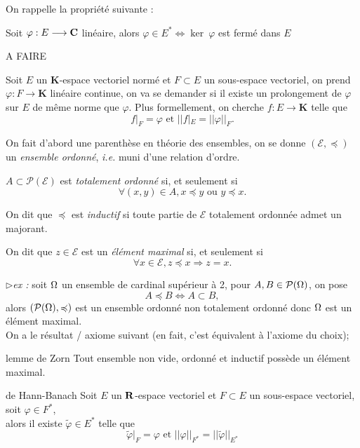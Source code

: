 \documentclass[a4paper,11pt, twoside]{article}
\begin{document}
On rappelle la propriété suivante : 


\begin{prop}
  Soit $\varphi:E\longrightarrow \mathbf C$ linéaire,
  alors $\varphi\in E^*\Leftrightarrow\ker\ \varphi$ est fermé dans $E$
\end{prop}


\begin{Proof}
  A FAIRE
\end{Proof}


Soit $E$ un $\mathbf K$-espace vectoriel normé et $F\subset E$ un sous-espace vectoriel, on prend $\varphi:F\longrightarrow \mathbf K$ linéaire continue, on va se demander si il existe un prolongement de $\varphi$ sur $E$ de même norme que $\varphi$. Plus formellement, on cherche $f:E\longrightarrow \mathbf K$ telle que 
$$f\big|_F=\varphi\text{ et }||f|_E=||\varphi||_F.$$

On fait d'abord une parenthèse en théorie des ensembles, on se donne $(\mathcal E,\preccurlyeq)$ un \emph{ensemble ordonné}, \emph{i.e.} muni d'une relation d'ordre.

$A\subset \mathcal P(\mathcal E)$ est \emph{totalement ordonné} si, et seulement si 
$$\forall (x,y)\in A, x\preccurlyeq y\text{ ou }y\preccurlyeq x.$$

On dit que $\preccurlyeq$ est \emph{inductif} si toute partie de $\mathcal E$ totalement ordonnée admet un majorant.

On dit que $z\in \mathcal E$ est un \emph{élément maximal} si, et seulement si 
$$\forall x\in \mathcal E, z\preccurlyeq x\Rightarrow z=x.$$


$\triangleright$\emph{ex :} soit $\Omega$ un ensemble de cardinal supérieur à 2, pour $A,B\in\mathcal P(\Omega)$, on pose
$$A\preccurlyeq B\Leftrightarrow A\subset B,$$
alors $(\mathcal P(\Omega),\preccurlyeq)$ est un ensemble ordonné non totalement ordonné donc $\Omega$ est un élément maximal.\\[1em]

On a le résultat / axiome suivant (en fait, c'est équivalent à l'axiome du choix);


\begin{thC}{lemme de Zorn}
  Tout ensemble non vide, ordonné et inductif possède un élément maximal.
\end{thC}


\begin{thC}{de Hann-Banach}
  Soit $E$ un $\mathbf R$-espace vectoriel et $F\subset E$ un sous-espace vectoriel, soit $\varphi\in F^*$,\\

  alors il existe $\tilde\varphi\in E^*$ telle que 
  $$\tilde\varphi\big|_F=\varphi\text{ et }||\varphi||_{F^*}=||\tilde\varphi||_{E^*}$$
\end{thC}
\end{document}
